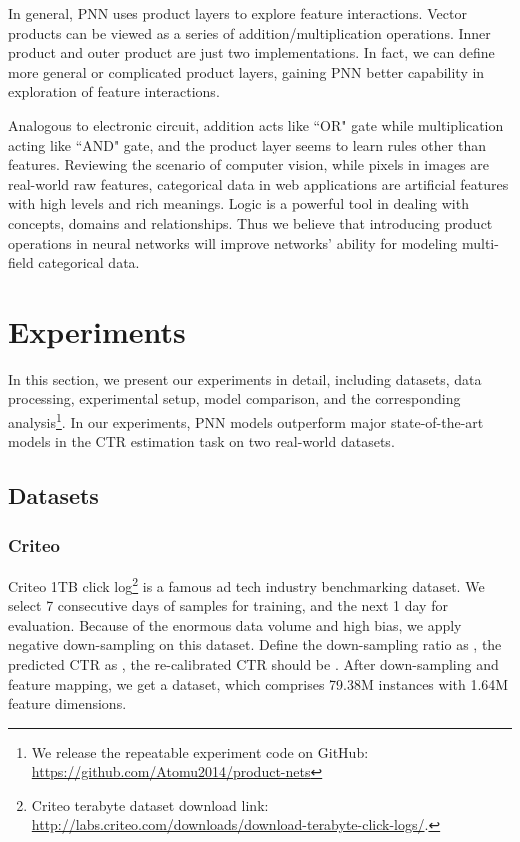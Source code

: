 \documentclass[conference]{IEEEtran}
\begin{document}
In general, PNN uses product layers to explore feature interactions. Vector products can be viewed as a series of addition/multiplication operations. Inner product and outer product are just two implementations. In fact, we can define more general or complicated product layers, gaining PNN better capability in exploration of feature interactions.

Analogous to electronic circuit, addition acts like ``OR" gate while multiplication acting like ``AND" gate, and the product layer seems to learn rules other than features. Reviewing the scenario of computer vision, while pixels in images are real-world raw features, categorical data in web applications are artificial features with high levels and rich meanings. Logic is a powerful tool in dealing with concepts, domains and relationships. Thus we believe that introducing product operations in neural networks will improve networks' ability for modeling multi-field categorical data.



\section{Experiments}\label{sec:experiment}
In this section, we present our experiments in detail, including datasets, data processing, experimental setup, model comparison, and the corresponding analysis\footnote{We release the repeatable experiment code on GitHub: \url{https://github.com/Atomu2014/product-nets}}. In our experiments, PNN models outperform major state-of-the-art models in the CTR estimation task on two real-world datasets.

\subsection{Datasets}
\subsubsection{Criteo}
Criteo 1TB click log\footnote{Criteo terabyte dataset download link: \url{http://labs.criteo.com/downloads/download-terabyte-click-logs/}.} is a famous ad tech industry benchmarking dataset.
We select 7 consecutive days of samples for training, and the next 1 day for evaluation. Because of the enormous data volume and high bias, we apply negative down-sampling on this dataset.
Define the down-sampling ratio as , the predicted CTR as , the re-calibrated CTR  should be  \cite{he2014practical}.
After down-sampling and feature mapping, we get a dataset, which comprises 79.38M instances with 1.64M feature dimensions.
\end{document}
